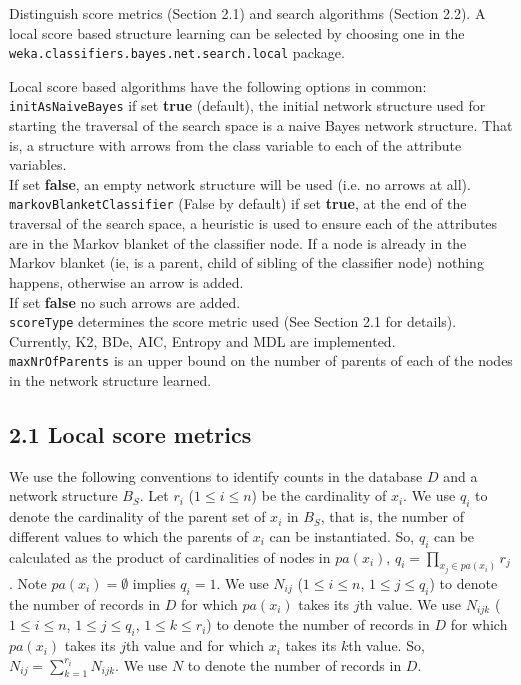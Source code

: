 \documentclass{article}
\begin{document}
Distinguish score metrics (Section 2.1) and search algorithms (Section 2.2).
A local score based structure learning can be selected by choosing one in the
{\tt weka.classifiers.bayes.net.search.local} package.

\begin{center}
\end{center}


Local score based algorithms have the following options in common:\\
{\tt initAsNaiveBayes} if set {\bf true} (default), the initial network structure used
for starting the traversal of the search space is a naive Bayes network 
structure. That is, a structure with arrows from the class variable to
each of the attribute variables.\\
If set {\bf false}, an empty network structure will be used (i.e. no arrows at all).\\
{\tt markovBlanketClassifier} (False by default) if set {\bf true},
at the end of the traversal of the search space, a heuristic is used
to ensure each of the attributes are in the Markov blanket of the 
classifier node. If a node is already in the Markov blanket (ie, is
a parent, child of sibling of the classifier node) nothing happens,
otherwise an arrow is added.\\
If set {\bf false} no such arrows are added.\\
{\tt scoreType} determines the score metric used (See Section 2.1
for details). Currently, K2, BDe, AIC, Entropy and MDL are implemented.\\
{\tt maxNrOfParents} is an upper bound on the number of parents of each of the
nodes in the network structure learned.

\subsection*{2.1 Local score metrics \label{sec.score.metric}}

We use the following conventions to identify counts in the database
$D$ and a network structure $B_S$.  Let $r_i$ ($1\le i\le n$) be the
cardinality of $x_i$.  We use $q_i$ to denote the cardinality of the
parent set of $x_i$ in $B_S$,  that is, the number of different values
to which the parents of $x_i$ can be  instantiated.  So, $q_i$ can be
calculated as the product of cardinalities of nodes in $pa(x_i)$,
$q_i=\prod_{x_j\in pa(x_i)}r_j$.  Note $pa(x_i)=\emptyset$ implies
$q_i=1$.
%
 We use $N_{ij}$ ($1\le i\le n$, $1\le j\le q_i$) to denote the number
of records in $D$ for which $pa(x_i)$ takes its $j$th value.%
We use $N_{ijk}$ ($1\le i\le n$, $1\le j\le q_i$, $1\le k\le r_i$) to
denote the number of records in $D$ for which $pa(x_i)$ takes its
$j$th value and for which $x_i$ takes its $k$th value.
%
So, $N_{ij}=\sum_{k=1}^{r_i}N_{ijk}$.  We use $N$ to denote the number
of records in $D$.
\end{document}
